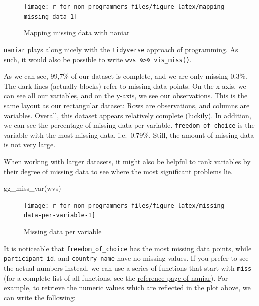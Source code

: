 \documentclass[
]{book}
\newenvironment{Shaded}{\begin{snugshade}}{\end{snugshade}}
\newcommand{\FunctionTok}[1]{\textcolor[rgb]{0.00,0.00,0.00}{#1}}
\newcommand{\NormalTok}[1]{#1}
\begin{document}
\begin{figure}

{\centering \texttt{[image: r\_for\_non\_programmers\_files/figure-latex/mapping-missing-data-1]} 

}

\caption{Mapping missing data with naniar}\label{fig:mapping-missing-data}
\end{figure}

\texttt{naniar} plays along nicely with the \texttt{tidyverse} approach of programming. As such, it would also be possible to write \texttt{wvs\ \%\textgreater{}\%\ vis\_miss()}.

As we can see, 99,7\% of our dataset is complete, and we are only missing 0.3\%. The dark lines (actually blocks) refer to missing data points. On the x-axis, we can see all our variables, and on the y-axis, we see our observations. This is the same layout as our rectangular dataset: Rows are observations, and columns are variables. Overall, this dataset appears relatively complete (luckily). In addition, we can see the percentage of missing data per variable. \texttt{freedom\_of\_choice} is the variable with the most missing data, i.e.~0.79\%. Still, the amount of missing data is not very large.

When working with larger datasets, it might also be helpful to rank variables by their degree of missing data to see where the most significant problems lie.

\begin{Shaded}
\begin{Highlighting}[]
\FunctionTok{gg\_miss\_var}\NormalTok{(wvs)}
\end{Highlighting}
\end{Shaded}

\begin{figure}

{\centering \texttt{[image: r\_for\_non\_programmers\_files/figure-latex/missing-data-per-variable-1]} 

}

\caption{Missing data per variable}\label{fig:missing-data-per-variable}
\end{figure}

It is noticeable that \texttt{freedom\_of\_choice} has the most missing data points, while \texttt{participant\_id}, and \texttt{country\_name} have no missing values. If you prefer to see the actual numbers instead, we can use a series of functions that start with \texttt{miss\_} (for a complete list of all functions, see the \href{https://naniar.njtierney.com/reference/index.html}{reference page of naniar}). For example, to retrieve the numeric values which are reflected in the plot above, we can write the following:
\end{document}
